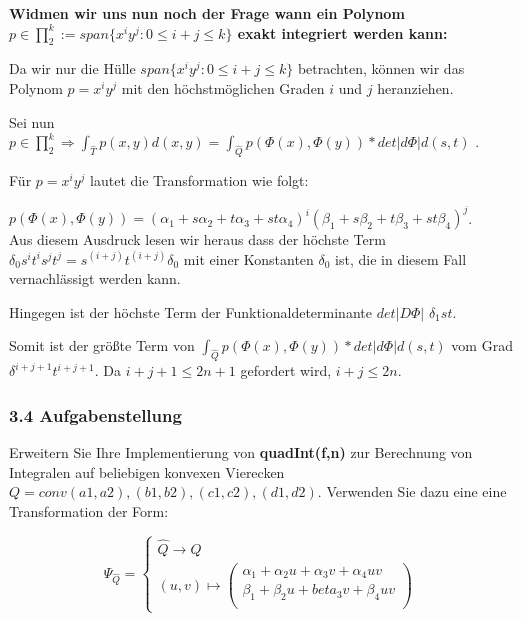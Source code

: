 \documentclass[a4paper,11pt,bibliography=totoc,listof=totoc,headinclude=true,cleardoublepage=empty,oneside]{scrbook}
\begin{document}
		\begin{flushleft}
		
		\color{change2}
		\textbf{Widmen wir uns nun noch der Frage wann ein Polynom $ p \in \prod_{2}^k:=span\{x^iy^j:0 \leq i+j\leq k \} $ exakt integriert werden kann:}
		
		Da wir nur die Hülle $span\{x^iy^j:0 \leq i+j \leq k\}$ betrachten, können wir das Polynom $p=x^iy^j$ mit den höchstmöglichen Graden $i$ und $j$ heranziehen.
		
		Sei nun $ p \in \prod_{2}^k \Rightarrow \int_{\hat{T}}^{} p(x,y)d(x,y) = 
		\int_{\hat{Q}}^{} p(\Phi(x),\Phi(y)) * det|d\Phi| d(s,t)$ .
		
		Für $p=x^iy^j$ lautet die Transformation wie folgt:
		
		$p(\Phi(x),\Phi(y)) = (\alpha_1+s\alpha_2+t\alpha_3+st\alpha_4)^i(\beta_1+s\beta_2+t\beta_3+st\beta_4)^j$. \\
		
		Aus diesem Ausdruck lesen wir heraus dass der höchste Term $\delta_0s^it^is^jt^j = s^{(i+j)}t^{(i+j)}\delta_0$	mit einer Konstanten $\delta_0$ ist, die in diesem Fall vernachlässigt werden kann.
			
			Hingegen ist der höchste Term der Funktionaldeterminante $det|D\Phi|$ $\delta_1st$.
			
			
			Somit ist der größte Term von
			 $\int_{\hat{Q}}^{} p(\Phi(x),\Phi(y)) * det|d\Phi| d(s,t)$ 
			 vom Grad
			 $\delta^{i+j+1}t^{i+j+1}$.
			 Da $i+j+1\leq2n+1$ gefordert wird,  $i+j\leq2n$.
			 			
			
		\end{flushleft}
\vspace{1cm}
		\color{black}
		\subsubsection{3.4 Aufgabenstellung} 
		 Erweitern Sie Ihre Implementierung von \textbf{quadInt(f,n)} zur Berechnung von Integralen auf beliebigen konvexen Vierecken $ Q=conv{(a1,a2),(b1,b2),(c1,c2),(d1,d2)} $. Verwenden Sie dazu eine eine Transformation der Form:
		
			\begin{equation} 
			\Psi_{\hat{Q}} = \begin{cases} 
			\hat{Q} \to Q \\
			(u,v) \mapsto
			
		 \left(
		  \begin{array}{ccc}
		  \alpha_1 + \alpha_{2}u + \alpha_{3}v +\alpha_{4}uv \\
		  \beta_1+\beta_{2}u+beta_{3}v+\beta_{4}uv \\
		  \end{array}
		  \right)

			\end{cases} 
			\end{equation} \\
			
\end{document}

